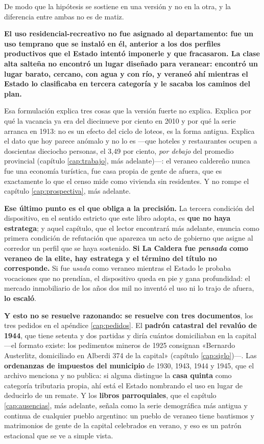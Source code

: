 \begin{cautela}
De modo que la hipótesis se sostiene en una versión y no en la otra, y la diferencia entre
ambas no es de matiz.

\textbf{El uso residencial-recreativo no fue asignado al departamento: fue un uso temprano
que se instaló en él, anterior a los dos perfiles productivos que el Estado intentó imponerle y
que fracasaron. La clase alta salteña no encontró un lugar diseñado para veranear: encontró un
lugar barato, cercano, con agua y con río, y veraneó ahí mientras el Estado lo clasificaba en
tercera categoría y le sacaba los caminos del plan.}

Esa formulación explica tres cosas que la versión fuerte no explica. Explica por qué la
vacancia ya era del diecinueve por ciento en 2010 y por qué la serie arranca en 1913: no es un
efecto del ciclo de loteos, es la forma antigua. Explica el dato que hoy parece anómalo y no lo
es ---que hoteles y restaurantes ocupen a doscientas dieciocho personas, el 3,49 por ciento,
\textit{por debajo} del promedio provincial (capítulo \ref{cap:trabajo}, más adelante)---: el veraneo
caldereño nunca fue una economía turística, fue casa propia de gente de afuera, que es
exactamente lo que el censo mide como vivienda sin residentes. Y no rompe el capítulo
\ref{cap:prospectiva}, más adelante.

\textbf{Ese último punto es el que obliga a la precisión.} La tercera condición del dispositivo,
en el sentido estricto que este libro adopta, es \textbf{que no haya estratega}; y aquel
capítulo, que el lector encontrará más adelante, enuncia como primera condición de refutación que aparezca un acto de gobierno que
asigne al corredor un perfil que se haya sostenido. \textbf{Si La Caldera fue \textit{pensada}
como veraneo de la elite, hay estratega y el término del título no corresponde.} Si fue
\textit{usada} como veraneo mientras el Estado le probaba vocaciones que no prendían, el
dispositivo queda en pie y gana profundidad: el mercado inmobiliario de los años dos mil no
inventó el uso ni lo trajo de afuera, \textbf{lo escaló}.

\textbf{Y esto no se resuelve razonando: se resuelve con tres documentos}, los tres pedidos en
el apéndice \ref{cap:pedidos}. El \textbf{padrón catastral del revalúo de 1944}, que tiene
setenta y dos partidas y diría cuántos domiciliaban en la capital ---el formato existe: los
pedimentos mineros de 1925 consignan «Bernardo Austerlitz, domiciliado en Alberdi 374 de la
capital» (capítulo \ref{cap:siglo})---. Las \textbf{ordenanzas de impuestos del municipio} de
1930, 1943, 1944 y 1945, que el archivo menciona y no publica: si alguna distingue la
\textbf{casa quinta} como categoría tributaria propia, ahí está el Estado nombrando el uso en
lugar de deducirlo de un remate. Y los \textbf{libros parroquiales}, que el capítulo
\ref{cap:ausencias}, más adelante, señala como la serie demográfica más antigua y continua de cualquier pueblo
argentino: un pueblo de veraneo tiene bautismos y matrimonios de gente de la capital celebrados
en verano, y eso es un patrón estacional que se ve a simple vista.


\end{cautela}
